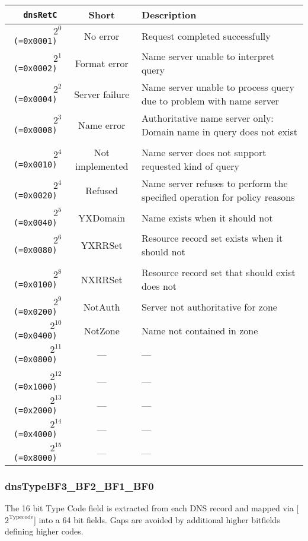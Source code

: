 \documentclass[documentation]{subfiles}
\begin{document}
\begin{longtable}{>{\tt}rcl}
    \toprule
    {\bf dnsRetC}      & {\bf Short}     & {\bf Description}\\
    \midrule\endhead%
    $2^{0}$  (=0x0001) & No error        & Request completed successfully \\
    $2^{1}$  (=0x0002) & Format error    & Name server unable to interpret query \\
    $2^{2}$  (=0x0004) & Server failure  & Name server unable to process query due to problem with name server \\
    $2^{3}$  (=0x0008) & Name error      & Authoritative name server only: Domain name in query does not exist \\
    \\
    $2^{4}$  (=0x0010) & Not implemented & Name server does not support requested kind of query \\
    $2^{4}$  (=0x0020) & Refused         & Name server refuses to perform the specified operation for policy reasons \\
    $2^{5}$  (=0x0040) & YXDomain        & Name exists when it should not \\
    $2^{6}$  (=0x0080) & YXRRSet         & Resource record set exists when it should not \\
    \\
    $2^{8}$  (=0x0100) & NXRRSet         & Resource record set that should exist does not \\
    $2^{9}$  (=0x0200) & NotAuth         & Server not authoritative for zone \\
    $2^{10}$ (=0x0400) & NotZone         & Name not contained in zone \\
    $2^{11}$ (=0x0800) & ---             & --- \\
    \\
    $2^{12}$ (=0x1000) & ---             & --- \\
    $2^{13}$ (=0x2000) & ---             & --- \\
    $2^{14}$ (=0x4000) & ---             & --- \\
    $2^{15}$ (=0x8000) & ---             & --- \\
    \bottomrule
\end{longtable}

\subsubsection{dnsTypeBF3\_BF2\_BF1\_BF0}\label{dnsTypeBF}
The 16 bit Type Code field is extracted from each DNS record and mapped via [$2^{\text{Typecode}}$] into a
64 bit fields. Gaps are avoided by additional higher bitfields defining higher codes.
\end{document}
